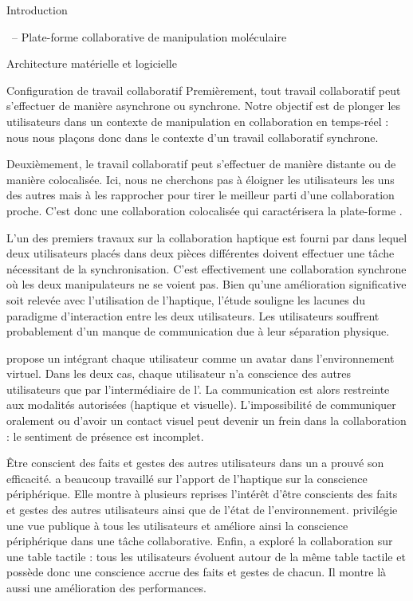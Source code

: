 \documentclass[myfrancais]{mythesis}
\begin{document}
\begin{mypart}{Introduction}
\begin{mychapter}{\myShaddock\ -- Plate-forme collaborative de manipulation moléculaire}
\begin{mysection}{Architecture matérielle et logicielle}
\begin{mysubsection}{Configuration de travail collaboratif}
					Premièrement, tout travail collaboratif peut s'effectuer de manière asynchrone ou synchrone.
					Notre objectif est de plonger les utilisateurs dans un contexte de manipulation en collaboration en temps-réel : nous nous plaçons donc dans le contexte d'un travail collaboratif synchrone.

					Deuxièmement, le travail collaboratif peut s'effectuer de manière distante ou de manière colocalisée.
					Ici, nous ne cherchons pas à éloigner les utilisateurs les uns des autres mais à les rapprocher pour tirer le meilleur parti d'une collaboration proche.
					C'est donc une collaboration colocalisée qui caractérisera la plate-forme \myShaddock.

					L'un des premiers travaux sur la collaboration haptique est fourni par  dans lequel deux utilisateurs placés dans deux pièces différentes doivent effectuer une tâche nécessitant de la synchronisation.
					C'est effectivement une collaboration synchrone où les deux manipulateurs ne se voient pas.
					Bien qu'une amélioration significative soit relevée avec l'utilisation de l'haptique, l'étude souligne les lacunes du paradigme d'interaction entre les deux utilisateurs.
					Les utilisateurs souffrent probablement d'un manque de communication due à leur séparation physique.

					 propose un  intégrant chaque utilisateur comme un avatar dans l'environnement virtuel.
					Dans les deux cas, chaque utilisateur n'a conscience des autres utilisateurs que par l'intermédiaire de l'.
					La communication est alors restreinte aux modalités autorisées (haptique et visuelle).
					L'impossibilité de communiquer oralement ou d'avoir un contact visuel peut devenir un frein dans la collaboration : le sentiment de présence est incomplet.

					Être conscient des faits et gestes des autres utilisateurs dans un  a prouvé son efficacité.
					 a beaucoup travaillé sur l'apport de l'haptique sur la conscience périphérique.
					Elle montre à plusieurs reprises l'intérêt d'être conscients des faits et gestes des autres utilisateurs ainsi que de l'état de l'environnement.
					 privilégie une vue publique à tous les utilisateurs et améliore ainsi la conscience périphérique dans une tâche collaborative.
					Enfin,  a exploré la collaboration sur une table tactile : tous les utilisateurs évoluent autour de la même table tactile et possède donc une conscience accrue des faits et gestes de chacun.
					Il montre là aussi une amélioration des performances.


\end{mysubsection}
\end{mysection}
\end{mychapter}
\end{mypart}
\end{document}
